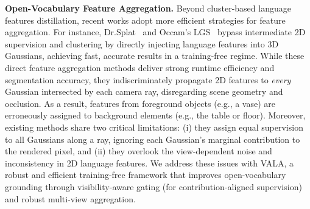 \textbf{Open-Vocabulary Feature Aggregation.}
Beyond cluster-based language features distillation, recent works adopt more efficient strategies for feature aggregation. For instance, Dr.Splat~\cite{drsplat25} and Occam's LGS~\cite{cheng2024occam} bypass intermediate 2D supervision and clustering by directly injecting language features into 3D Gaussians, achieving fast, accurate results in a training-free regime. While these direct feature aggregation methods deliver strong runtime efficiency and segmentation accuracy, they indiscriminately propagate 2D features to \emph{every} Gaussian intersected by each camera ray, disregarding scene geometry and occlusion. As a result, features from foreground objects (e.g., a vase) are erroneously assigned to background elements (e.g., the table or floor). Moreover, existing methods share two critical limitations: (i) they assign equal supervision to all Gaussians along a ray, ignoring each Gaussian’s marginal contribution to the rendered pixel, and (ii) they overlook the view-dependent noise and inconsistency in 2D language features. We address these issues with VALA, a robust and efficient training-free framework that improves open-vocabulary grounding through visibility-aware gating (for contribution-aligned supervision) and robust multi-view aggregation.
